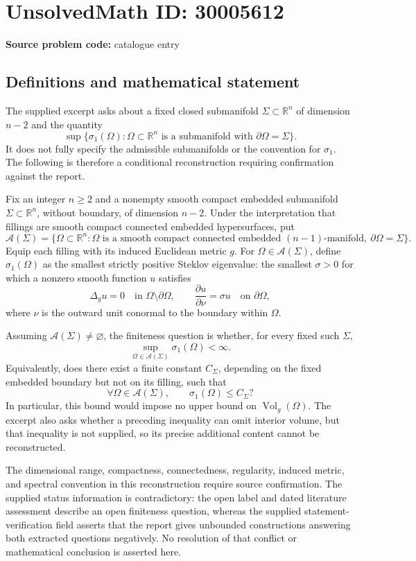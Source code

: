 \documentclass[11pt]{article}
\newcommand{\R}{\mathbb{R}}
\begin{document}
\section*{UnsolvedMath ID: 30005612}
\textbf{Source problem code:} catalogue entry
\subsection{Definitions and mathematical statement}
The supplied excerpt asks about a fixed closed submanifold \(\Sigma\subset\R^n\) of dimension \(n-2\) and the quantity
\[
\sup\{\sigma_1(\Omega):\Omega\subset\R^n\text{ is a submanifold with }\partial\Omega=\Sigma\}.
\]
It does not fully specify the admissible submanifolds or the convention for \(\sigma_1\). The following is therefore a conditional reconstruction requiring confirmation against the report.

Fix an integer \(n\geq2\) and a nonempty smooth compact embedded submanifold \(\Sigma\subset\R^n\), without boundary, of dimension \(n-2\). Under the interpretation that fillings are smooth compact connected embedded hypersurfaces, put
\[
\mathcal A(\Sigma)=\{\Omega\subset\R^n:\Omega\text{ is a smooth compact connected embedded }(n-1)\text{-manifold},\ \partial\Omega=\Sigma\}.
\]
Equip each filling with its induced Euclidean metric \(g\). For \(\Omega\in\mathcal A(\Sigma)\), define \(\sigma_1(\Omega)\) as the smallest strictly positive Steklov eigenvalue: the smallest \(\sigma>0\) for which a nonzero smooth function \(u\) satisfies
\[
\Delta_g u=0\quad\text{in }\Omega\setminus\partial\Omega,
\qquad
\frac{\partial u}{\partial\nu}=\sigma u\quad\text{on }\partial\Omega,
\]
where \(\nu\) is the outward unit conormal to the boundary within \(\Omega\).

Assuming \(\mathcal A(\Sigma)\ne\varnothing\), the finiteness question is whether, for every fixed such \(\Sigma\),
\[
\sup_{\Omega\in\mathcal A(\Sigma)}\sigma_1(\Omega)<\infty.
\]
Equivalently, does there exist a finite constant \(C_\Sigma\), depending on the fixed embedded boundary but not on its filling, such that
\[
\forall\Omega\in\mathcal A(\Sigma),\qquad \sigma_1(\Omega)\leq C_\Sigma?
\]
In particular, this bound would impose no upper bound on \(\operatorname{Vol}_g(\Omega)\). The excerpt also asks whether a preceding inequality can omit interior volume, but that inequality is not supplied, so its precise additional content cannot be reconstructed.

The dimensional range, compactness, connectedness, regularity, induced metric, and spectral convention in this reconstruction require source confirmation. The supplied status information is contradictory: the open label and dated literature assessment describe an open finiteness question, whereas the supplied statement-verification field asserts that the report gives unbounded constructions answering both extracted questions negatively. No resolution of that conflict or mathematical conclusion is asserted here.
\end{document}
